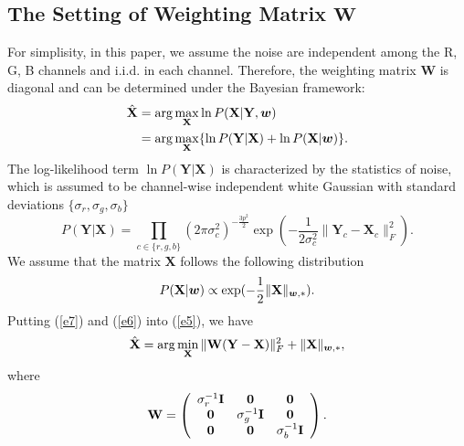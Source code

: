 \documentclass[10pt,twocolumn,letterpaper,sort&compress]{article}
\begin{document}
\subsection{The Setting of Weighting Matrix $\mathbf{W}$}
For simplisity, in this paper, we assume the noise are independent among the R, G, B channels and i.i.d. in each channel. Therefore, the weighting matrix $\mathbf{W}$ is diagonal and can be determined under the Bayesian framework:
\vspace{-3mm}
\begin{equation}
\label{e5}
\vspace{-3mm}
\begin{split}
\hat{\mathbf{X}} 
&=
\arg\max_{\mathbf{X}}\ln P(\mathbf{X}|\mathbf{Y},\bm{w})
\\
&
=
\arg\max_{\mathbf{X}}\{\ln P(\mathbf{Y}|\mathbf{X})+\ln P(\mathbf{X}|\bm{w})\}.
\end{split}
\end{equation}
The log-likelihood term $\ln P(\mathbf{Y}|\mathbf{X})$ is characterized by the
statistics of noise, which is assumed to be channel-wise independent white Gaussian with standard deviations $\{\sigma_{r}, \sigma_{g}, \sigma_{b}\}$
\vspace{-4mm}
\begin{equation}
\label{e6}
P(\mathbf{Y}|\mathbf{X}) 
= 
\prod_{c\in\{r, g, b\}}
(2\pi\sigma_{c}^{2})^{-\frac{3p^{2}}{2}}
\exp(-\frac{1}{2\sigma_{c}^{2}}\|\mathbf{Y}_{c}-\mathbf{X}_{c}\|_{F}^{2}).
\end{equation}
We assume that the matrix $\mathbf{X}$ follows the following distribution
\vspace{-2mm}
\begin{equation}
\label{e7}
\vspace{-2mm}
P(\mathbf{X}|\bm{w})
\propto
\exp(-\frac{1}{2}\|\mathbf{X}\|_{\bm{w},*}).
\end{equation}
Putting (\ref{e7}) and (\ref{e6}) into (\ref{e5}), we have
\vspace{-2mm}
\begin{equation}
\vspace{-2mm}
\hat{\mathbf{X}}=\arg\min_{\mathbf{X}}\|\mathbf{W}(\mathbf{Y}-\mathbf{X})\|_{F}^{2}+\|\mathbf{X}\|_{\bm{w},*},
\end{equation}
where
\begin{equation}
\label{e9}
\vspace{-2mm}
\mathbf{W}
=
\left( \begin{array}{ccc}
\sigma_{r}^{-1}\mathbf{I} & \mathbf{0} & \mathbf{0}
\\
\mathbf{0} & \sigma_{g}^{-1}\mathbf{I} & \mathbf{0}
\\
\mathbf{0} & \mathbf{0} & \sigma_{b}^{-1}\mathbf{I}
\end{array} \right).
\end{equation}
\end{document}
